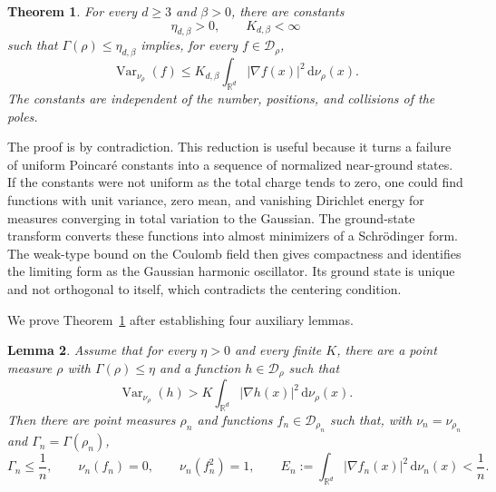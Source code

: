 \documentclass[12pt,reqno,letterpaper]{amsart}
\newtheorem{theorem}{Theorem}[section]
\newtheorem{lemma}[theorem]{Lemma}
\theoremstyle{definition}
\theoremstyle{remark}
\numberwithin{equation}{section}
\newcommand{\R}{\mathbb R}
\newcommand{\dd}{\,\mathrm d}
\newcommand{\be}{\beta}
\newcommand{\cD}{\mathcal D}
\newcommand{\Var}{\operatorname{Var}}
\begin{document}
\begin{theorem}\label{thm:onesite}
For every \(d\ge3\) and \(\be>0\), there are constants
\begin{equation*}
 \eta_{d,\be}>0,
 \qquad
 K_{d,\be}<\infty
\end{equation*}
such that \(\Gamma(\rho)\le\eta_{d,\be}\) implies, for every
\(f\in\cD_{\rho}\),
\begin{equation*}
 \Var_{\nu_{\rho}}(f)
 \le K_{d,\be}\int_{\R^d}|\nabla f(x)|^2\dd\nu_{\rho}(x).
\end{equation*}
The constants are independent of the number, positions, and collisions of
the poles.
\end{theorem}

The proof is by contradiction.  This reduction is useful because it turns a
failure of uniform Poincar\'e constants into a sequence of normalized
near-ground states.  If the constants were not uniform as the total charge
tends to zero, one could find functions with unit variance, zero mean, and
vanishing Dirichlet energy for measures converging in total variation to the
Gaussian.  The ground-state transform converts these functions into almost
minimizers of a Schr\"odinger form.  The weak-type bound on the Coulomb field
then gives compactness and identifies the limiting form as the Gaussian
harmonic oscillator.  Its ground state is unique and not orthogonal to itself,
which contradicts the centering condition.

We prove Theorem~\ref{thm:onesite} after establishing four auxiliary
lemmas.

\begin{lemma}
\label{lem:normalized-counterexample}
Assume that for every \(\eta>0\) and every finite \(K\), there are a point
measure \(\rho\) with \(\Gamma(\rho)\le\eta\) and a function
\(h\in\cD_\rho\) such that
\[
 \Var_{\nu_\rho}(h)
 >K\int_{\R^d}|\nabla h(x)|^2\dd\nu_\rho(x).
\]
Then there are point measures \(\rho_n\) and functions
\(f_n\in\cD_{\rho_n}\) such that, with
\(\nu_n=\nu_{\rho_n}\) and \(\Gamma_n=\Gamma(\rho_n)\),
\[
 \Gamma_n\le\frac1n,
 \qquad
 \nu_n(f_n)=0,
 \qquad
 \nu_n(f_n^2)=1,
 \qquad
 E_n:=\int_{\R^d}|\nabla f_n(x)|^2\dd\nu_n(x)<\frac1n.
\]
\end{lemma}
\end{document}
